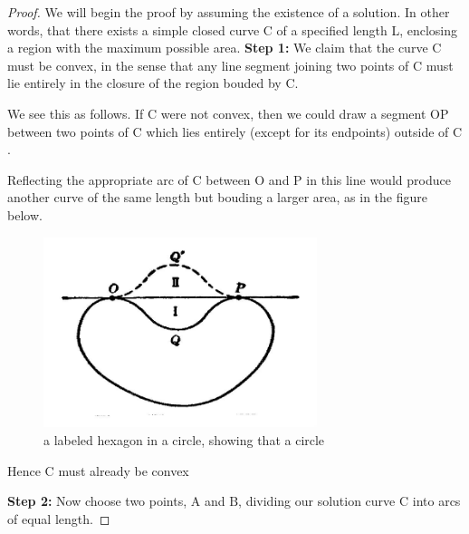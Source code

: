 \documentclass[a4paper]{book}
\numberwithin{theorem}{section}%
\begin{document}
\begin{proof} 
    We will begin the proof by assuming the existence of a solution. In other words, that there exists a simple closed curve $\mathrm{C}$ of a specified length L, enclosing a region with the maximum possible area.
    \textbf{Step 1:} We claim that the curve $\mathrm{C}$ must be convex, in the sense that any line segment joining two points of $\mathrm{C}$ must lie entirely in the closure of the region bouded by $\mathrm{C}$.

    We see this as follows. If $\mathrm{C}$ were not convex, then we could draw a segment $\mathrm{OP}$ between two points of $\mathrm{C}$ which lies entirely (except for its endpoints) outside of $\mathrm{C}$.

    Reflecting the appropriate arc of $\mathrm{C}$ between $\mathrm{O}$ and $\mathrm{P}$ in this line would produce another curve of the same length but bouding a larger area, as in the figure below.
    \begin{figure}[hbt!]
        \begin{center}   
            \includegraphics[width=80mm]{steiner1}
            \caption{a labeled hexagon in a circle, showing that a circle }
        \end{center}
    \end{figure}\leavevmode
    Hence $\mathrm{C}$ must already be convex

    \textbf{Step 2:} Now choose  two points, $\mathrm{A}$ and $\mathrm{B}$, dividing our solution curve $\mathrm{C}$ into arcs of equal length.


\end{proof}
\end{document}
